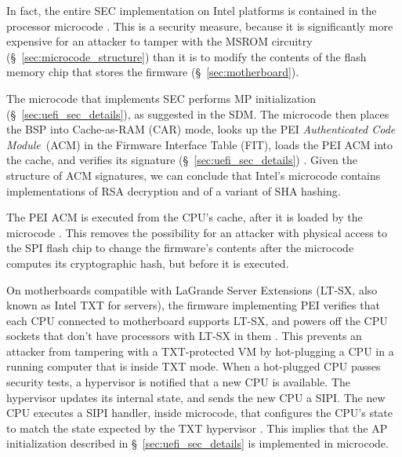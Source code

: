 
In fact, the entire SEC implementation on Intel platforms is contained in the
processor microcode \cite{datta2010trustedboot, datta2013acm, intel2014vapic}.
This is a security measure, because  it is significantly more expensive for an
attacker to tamper with the MSROM circuitry (\S~\ref{sec:microcode_structure})
than it is to modify the contents of the flash memory chip that stores the
firmware (\S~\ref{sec:motherboard}).

The microcode that implements SEC performs MP initialization
(\S~\ref{sec:uefi_sec_details}), as suggested in the SDM. The microcode then
places the BSP into Cache-as-RAM (CAR) mode, looks up the PEI
\textit{Authenticated Code Module}~(ACM) in the Firmware Interface Table (FIT),
loads the PEI ACM into the cache, and verifies its signature
(\S~\ref{sec:uefi_sec_details}) \cite{datta2010trustedboot, intel2012patching,
intel2012uefihypervisor, intel2012ltsx, datta2013acm}. Given the structure of
ACM signatures, we can conclude that Intel's microcode contains implementations
of RSA decryption and of a variant of SHA hashing.

The PEI ACM is executed from the CPU's cache, after it is loaded by the
microcode \cite{datta2010trustedboot, intel2012patching, datta2013acm}. This
removes the possibility for an attacker with physical access to the SPI flash
chip to change the firmware's contents after the microcode computes its
cryptographic hash, but before it is executed.


On motherboards compatible with LaGrande Server Extensions (LT-SX, also known
as Intel TXT for servers), the firmware implementing PEI verifies that each CPU
connected to motherboard supports LT-SX, and powers off the CPU sockets that
don't have processors with LT-SX in them \cite{intel2012ltsx}. This prevents an
attacker from tampering with a TXT-protected VM by hot-plugging a CPU in a
running computer that is inside TXT mode. When a hot-plugged CPU passes
security tests, a hypervisor is notified that a new CPU is available. The
hypervisor updates its internal state, and sends the new CPU a SIPI. The new
CPU executes a SIPI handler, inside microcode, that configures the CPU's state
to match the state expected by the TXT hypervisor \cite{intel2012ltsx}. This
implies that the AP initialization described in \S~\ref{sec:uefi_sec_details}
is implemented in microcode.


